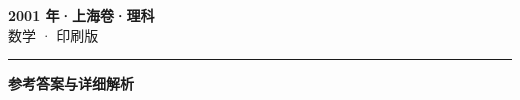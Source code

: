 \documentclass[zihao=5, a4paper]{ctexart}
\begin{document}
\begin{center}
  {\Large\bfseries 2001 年·上海卷·理科}\\[4pt]
  {\large 数学 · 印刷版}
\end{center}
\medskip
{}

\par\bigskip\hrule\bigskip
{}
\begin{center}{\large\bfseries 参考答案与详细解析}\end{center}
\smallskip

\end{document}

